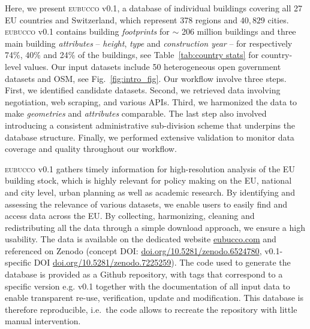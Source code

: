 \documentclass[fleqn,10pt]{wlscirep}
\begin{document}
Here, we present \textsc{eubucco} v0.1\cite{eubucco_v0.1_2022_dataset}, a database of individual buildings covering all 27 EU countries and Switzerland, which represent 378 regions and $40,829$ cities. \textsc{eubucco} v0.1 contains building \textit{footprints} for  $\sim$ 206 million buildings and three main building \textit{attributes} --  \textit{height}, \textit{type} and \textit{construction year} -- for respectively 74\%, 40\% and 24\% of the buildings, see Table~\ref{tab:country stats} for country-level values.
Our input datasets include 50 heterogeneous open government datasets and OSM, see Fig.~\ref{fig:intro_fig}. 
Our workflow involve three steps. First, we identified candidate datasets. Second, we retrieved data involving negotiation, web scraping, and various APIs. Third, we harmonized the data to make \textit{geometries} and \textit{attributes} comparable. The last step also involved introducing a consistent administrative sub-division scheme that underpins the database structure.
Finally, we performed extensive validation to monitor data coverage and quality throughout our workflow.

\textsc{eubucco} v0.1 gathers timely information for high-resolution analysis of the EU building stock, which is highly relevant for policy making on the EU, national and city level, urban planning as well as academic research. By identifying and assessing the relevance of various datasets, we enable users to easily find and access data across the EU. By collecting, harmonizing, cleaning and redistributing all the data through a simple download approach, we ensure a high usability. The data is available on the dedicated website \url{eubucco.com} and referenced on Zenodo\cite{eubucco_v0.1_2022_dataset} (concept DOI: \url{doi.org/10.5281/zenodo.6524780}, v0.1-specific DOI \url{doi.org/10.5281/zenodo.7225259}). The code used to generate the database is provided as a Github repository\cite{eubucco-0.1-code2022}, with tags that correspond to a specific version e.g. v0.1 together with the documentation of all input data to enable transparent re-use, verification, update and modification. This database is therefore reproducible, i.e.\ the code allows to recreate the repository with little manual intervention.
\end{document}
